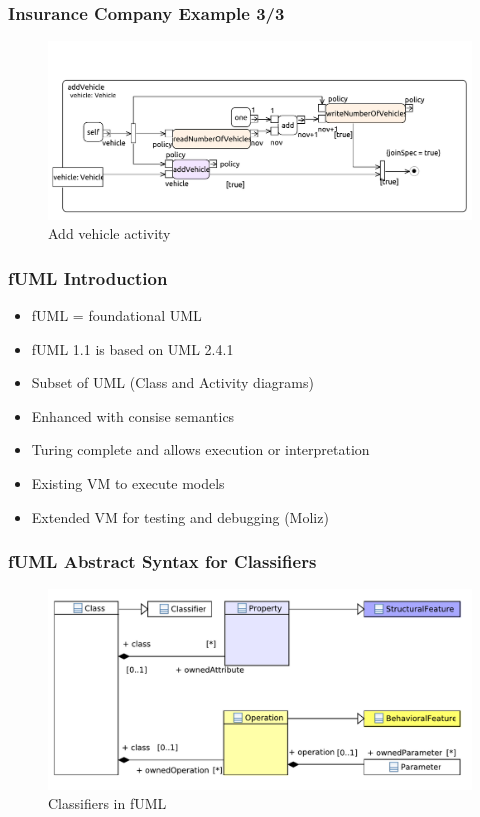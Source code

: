 \documentclass{beamer}
\begin{document}
\begin{frame}
\frametitle{Insurance Company Example 3/3}
\begin{figure}[h!t]
 \centering
 \includegraphics[scale=0.45]{images/insurance_ref/Activity_addVehicle_addVehicle}
 \caption{Add vehicle activity}
 \label{fig:calculatePremium}
\end{figure}
\end{frame}




\begin{frame}
\frametitle{fUML Introduction}
\begin{itemize}
 \item fUML = foundational UML \cite{man:FUML}
 \item fUML 1.1 is based on UML 2.4.1
 \item Subset of UML (Class and Activity diagrams)
 \item Enhanced with consise semantics
 \item Turing complete and allows execution or interpretation
 \item Existing VM to execute models
 \item Extended VM for testing and debugging (Moliz) \cite{DBLP:conf/models/MayerhoferLK12}
\end{itemize}
\end{frame}

\begin{frame}
\frametitle{fUML Abstract Syntax for Classifiers}
\begin{figure}[h!t]
 \centering
 \includegraphics[scale=0.5]{images/Model_Model_Classifiers_pres}
 \caption{Classifiers in fUML}
 \label{fig:classifiers}
\end{figure}
\end{frame}
\end{document}
